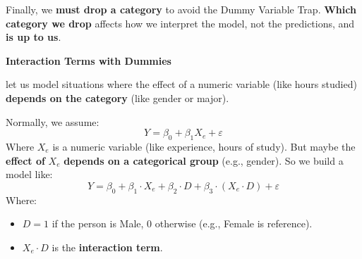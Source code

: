 \highspace
Finally, we \textbf{must drop a category} to avoid the Dummy Variable Trap. \textbf{Which category we drop} affects how we interpret the model, not the predictions, and \textbf{is up to us}.

\highspace
\begin{flushleft}
    \textcolor{Green3}{ \textbf{Interaction Terms with Dummies}}
\end{flushleft}
 let us model situations where the effect of a numeric variable (like hours studied) \textbf{depends on the category} (like gender or major).

\highspace
Normally, we assume:
\begin{equation*}
    Y = \beta_0 + \beta_1 X_e + \varepsilon
\end{equation*}
Where $X_e$ is a numeric variable (like experience, hours of study). But maybe the \textbf{effect of} $X_e$ \textbf{depends on a categorical group} (e.g., gender). So we build a model like:
\begin{equation*}
    Y = \beta_0 + \beta_1 \cdot X_e + \beta_2 \cdot D + \beta_3 \cdot \left(X_e \cdot D\right) + \varepsilon
\end{equation*}
Where:
\begin{itemize}
    \item $D = 1$ if the person is Male, 0 otherwise (e.g., Female is reference).
    \item $X_e \cdot D$ is the \textbf{interaction term}.
\end{itemize}

